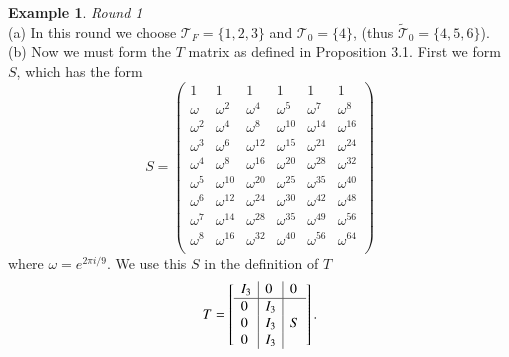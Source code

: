 \documentclass[preprint,12pt]{elsarticle}
\theoremstyle{definition}
\newtheorem{example}[thm]{Example}
\theoremstyle{remark}
\renewcommand{\emph}{\textit}
\begin{document}
\begin{example}
\emph{Round 1}\\
(a) In this round we choose $\mathcal{T}_F=\{1,2,3\}$ and $\mathcal{T}_0=\{4\}$, (thus $\tilde{\mathcal{T}}_0=\{4,5,6\}$).\\
(b) Now we must form the $T$ matrix as defined in Proposition 3.1.  First we form $S$, which has the form $$S=\left(\begin{matrix}
1 & 1 & 1 & 1 & 1 & 1\\
\omega &\omega^2 &\omega^4 &\omega^5 &\omega^7 &\omega^8 \\
\omega^2 &\omega^4 &\omega^8 &\omega^{10} &\omega^{14} &\omega^{16} \\
\omega^3 &\omega^6 &\omega^{12} &\omega^{15} &\omega^{21} &\omega^{24} \\
\omega^4 &\omega^8 &\omega^{16} &\omega^{20} &\omega^{28} &\omega^{32} \\
\omega^5 &\omega^{10} &\omega^{20} &\omega^{25} &\omega^{35} &\omega^{40} \\
\omega^6 &\omega^{12} &\omega^{24} &\omega^{30} &\omega^{42} &\omega^{48} \\
\omega^7 &\omega^{14} &\omega^{28} &\omega^{35} &\omega^{49} &\omega^{56} \\
\omega^8 &\omega^{16} &\omega^{32} &\omega^{40} &\omega^{56} &\omega^{64} \\
\end{matrix}\right)$$
where $\omega=e^{2\pi i/9}$. We use this $S$ in the definition of $T$
\[
T = \left[\begin{array}{l | l | l}
I_3 & 0 & 0 \\\hline
0 & I_{3} &  \\
0 & I_{3} & S \\
0 & I_{3} &  \\
\end{array}\right].
\]


\end{example}
\end{document}
